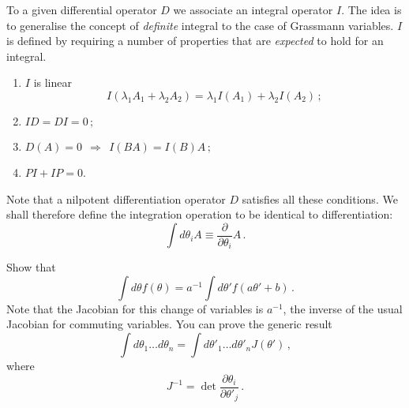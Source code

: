 \documentclass[notes]{subfiles}
\begin{document}
\begin{subappendices}
To a given differential operator $D$ we associate an integral
operator $I$. The idea is to generalise the concept of \emph{definite}
integral to the case of Grassmann variables. $I$ is defined by
requiring a number of properties that are \emph{expected} to hold for
an integral. 
\begin{enumerate}
\item $I$ is linear
  \begin{equation}
    \label{eq:LinearGrassInt}
    I(\lambda_1 A_1 + \lambda_2 A_2) = 
    \lambda_1 I(A_1) + \lambda_2 I(A_2)\, ;
  \end{equation}
\item $I D = D I = 0\, ;$
\item $D(A) = 0 ~~\Longrightarrow~~ I(BA) = I(B) A\, ;$
\item $P I + I P = 0$.
\end{enumerate}
Note that a nilpotent differentiation operator $D$ satisfies all these
conditions. We shall therefore define the integration operation to be
identical to differentiation:
\begin{equation}
  \label{eq:GrassIntDef}
  \int d\theta_i A \equiv \frac{\partial}{\partial\theta_i} A\, .
\end{equation}

Show that 
\begin{equation}
  \label{eq:GrassJacob}
  \int d\theta f(\theta) = a^{-1} \int d\theta' f(a \theta' + b)\, .
\end{equation}
Note that the Jacobian for this change of variables is $a^{-1}$, \ie
the inverse of the usual Jacobian for commuting variables. You can
prove the generic result
\begin{equation}
  \label{eq:GrassJacobOne}
  \int d\theta_1 \ldots d\theta_n = 
  \int d\theta'_1 \ldots d\theta'_n J(\theta')\, , 
\end{equation}
where 
\begin{equation}
  \label{eq:GrassJacobTwo}
  J^{-1} = \det \frac{\partial \theta_i}{\partial \theta'_j}\, .
\end{equation}

\end{subappendices}
\end{document}

